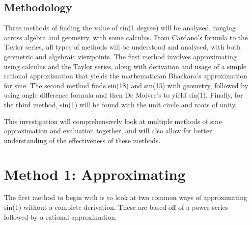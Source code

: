 \documentclass[12pt]{article}
\begin{document}
\subsection{Methodology}
Three methods of finding the value of sin(1 degree) will be analysed, ranging across algebra and geometry, with some calculus. From Cardano's formula to the Taylor series, all types of methods will be understood and analysed, with both geometric and algebraic viewpoints. The first method involves approximating using calculus and the Taylor series, along with derivation and usage of a simple rational approximation that yields the mathematician Bhaskara's approximation for sine. The second method finds sin(18) and sin(15) with geometry, followed by using angle difference formula and then De Moivre's to yield sin(1). Finally, for the third method, sin(1) will be found with the unit circle and roots of unity.

This investigation will comprehensively look at multiple methods of sine approximation and evaluation together, and will also allow for better understanding of the effectiveness of these methods.

\section{Method 1: Approximating}
The first method to begin with is to look at two common ways of approximating sin(1) without a complete derivation. These are based off of a power series followed by a rational approximation.
\end{document}
